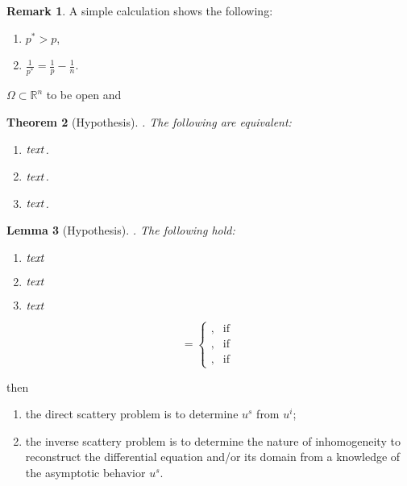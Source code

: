 \documentclass[a4paper,11pt]{article}
\newtheorem{theorem}{Theorem}[section]
\newtheorem{lemma}[theorem]{Lemma}
\theoremstyle{definition}
\newtheorem{remark}[theorem]{Remark}
\begin{document}
\begin{remark}
    A simple calculation shows the following:
    \begin{enumerate}[label=(\roman*)] 
    \rm\item $p^{\ast} > p$,
    \rm\item $\displaystyle \frac{1}{p^{\ast}} = \frac{1}{p} - \frac{1}{n}$.
    \end{enumerate}
\end{remark}

$\Omega \subset \mathbb{R}^{n}$ to be open and 

\begin{theorem}
[Hypothesis]. The following are equivalent:
\begin{enumerate}[label=(\roman*)]
\rm \item ${\it text}$. \label{item:1st}
\rm \item ${\it text}$. \label{item:2nd}
\rm \item ${\it text}$. \label{item:3rd}
\end{enumerate}
\end{theorem}

\begin{lemma}
[Hypothesis]. The following hold:
\begin{enumerate}[label=(\alph*)]
\rm \item ${\it text}$ \label{item:first}
\rm \item ${\it text}$ \label{item:second}
\rm \item ${\it text}$ \label{item:third}
\end{enumerate}
\end{lemma}

$$
 =
\begin{cases} 
, & \text{if } \\ 
, & \text{if } \\ 
, & \text{if }  
\end{cases}
$$



then
\begin{enumerate}
\rm\item the direct scattery problem is to determine $u^s$ from $u^i$;
\rm\item the inverse scattery problem is to determine the nature of inhomogeneity to reconstruct the differential equation and/or its domain from a knowledge of the asymptotic behavior $u^s$.
\end{enumerate}
\end{document}

